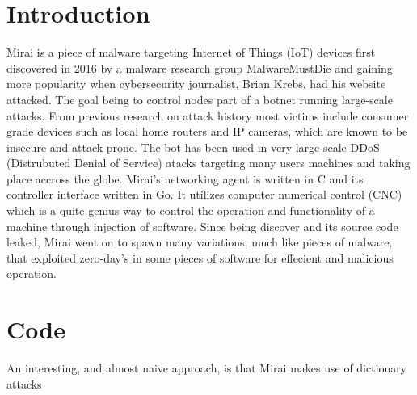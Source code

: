 \documentclass[12pt, letterpaper]{article}
\begin{document}
\begin{sloppypar}



\section*{Introduction}
\begin{flushleft}
Mirai is a piece of malware targeting Internet of Things (IoT) devices first discovered 
in 2016 by a malware research group MalwareMustDie and gaining more popularity when 
cybersecurity journalist, Brian Krebs, had his website attacked. The goal being to 
control nodes part of a botnet running large-scale attacks. From previous research on 
attack history most victims include consumer grade devices such as local home routers 
and IP cameras, which are known to be insecure and attack-prone. The bot has been used 
in very large-scale DDoS (Distrubuted Denial of Service) atacks targeting many users 
machines and taking place accross the globe. Mirai's networking agent is written in C 
and its controller interface written in Go. It utilizes computer numerical control (CNC) 
which is a quite genius way to control the operation and functionality of a machine 
through injection of software. Since being discover and its source code leaked, Mirai 
went on to spawn many variations, much like pieces of malware, that exploited zero-day's 
in some pieces of software for effecient and malicious operation. 
\end{flushleft}

\section*{Code}
\begin{flushleft}
An interesting, and almost naive approach, is that Mirai makes use of dictionary attacks



\end{flushleft}
\end{sloppypar}
\end{document}
